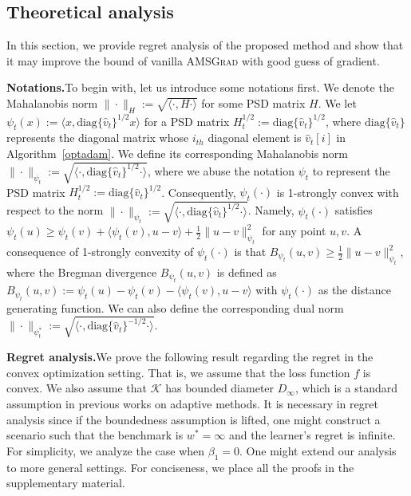 \documentclass[11pt]{article}
\def\K{\mathcal{K}}
\theoremstyle{k}
\begin{document}
\subsection{Theoretical analysis}
In this section, we provide regret analysis of the proposed method and show that it may improve the bound of vanilla \textsc{AMSGrad} with good guess of gradient.

\textbf{Notations.}\hspace{0.1in}To begin with, let us introduce some notations first.
We denote the Mahalanobis norm $\|\cdot\|_H := \sqrt{ \langle \cdot, H \cdot \rangle }$ for some PSD matrix $H$.
We let $\psi_t(x) := \langle x, \text{diag}\{\hat{v}_t\}^{1/2} x \rangle$ for a PSD matrix $H_t^{1/2}:= \text{diag}\{\hat{v}_t\}^{1/2}$, 
where $\text{diag}\{\hat{v}_t\}$ represents the diagonal matrix whose $i_{th}$ diagonal element is $\hat{v}_t[i]$ in Algorithm~\ref{optadam}.
We define its corresponding Mahalanobis norm $\| \cdot \|_{\psi_t}:= 
\sqrt{ \langle \cdot, \text{diag}\{\hat{v}_t\}^{1/2} \cdot \rangle }$,
where we abuse the notation $\psi_t$ to represent the PSD matrix $H_t^{1/2}:=\text{diag}\{\hat{v}_t\}^{1/2}$.
Consequently,
$\psi_t(\cdot)$ is 1-strongly convex with respect to the norm $\| \cdot \|_{\psi_t}:= 
\sqrt{ \langle \cdot, \text{diag}\{\hat{v}_t\}^{1/2} \cdot \rangle }$.
Namely, $\psi_t(\cdot)$ satisfies
$\psi_t(u) \geq \psi_t(v) + \langle \psi_t(v), u - v \rangle + \frac{1}{2} \| u - v\|^2_{\psi_t}$
for any point $u,v$.
A consequence of 1-strongly convexity of $\psi_t(\cdot)$ is that
$B_{\psi_t}(u,v) \geq \frac{1}{2} \| u - v \|^2_{\psi_t}$,
where the Bregman divergence $B_{\psi_t}(u,v)$ is defined as 
$B_{\psi_t}(u,v) := \psi_t(u)
- \psi_t(v) - \langle \psi_t(v), u - v \rangle
$ with $\psi_t(\cdot)$ as the distance generating function.
We can also define the corresponding dual norm $\| \cdot \|_{\psi_t^*}:= \sqrt{ \langle \cdot, \text{diag}\{\hat{v}_t\}^{-1/2} \cdot \rangle }$.

\textbf{Regret analysis.}\hspace{0.1in}We prove the following result regarding the regret in the convex optimization setting. That is, we assume that the loss function $f$ is convex. We also assume that $\K$ has bounded diameter $D_{\infty}$, which is a standard assumption in previous works \cite{RKK18,KB15} on adaptive methods. It is necessary in regret analysis since if the boundedness assumption is lifted, one might construct a scenario such that the benchmark is $w^* = \infty$ and the learner's regret is infinite. For simplicity, we analyze the case when $\beta_{1}=0$. One might extend our analysis to more general settings. For conciseness, we place all the proofs in the supplementary material.
\end{document}
